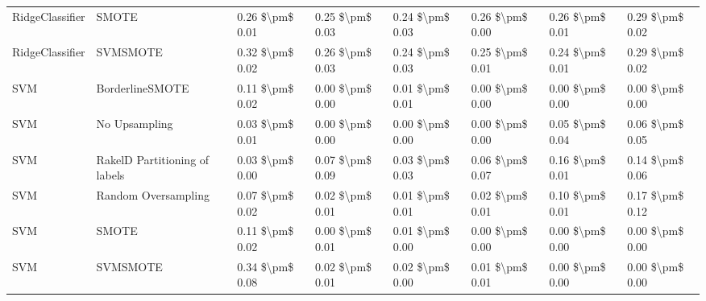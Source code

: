 \begin{tabular}{llllllll}
                RidgeClassifier &                         SMOTE &     0.26 \$\textbackslash pm\$ 0.01 &           0.25 \$\textbackslash pm\$ 0.03 &       0.24 \$\textbackslash pm\$ 0.03 &        0.26 \$\textbackslash pm\$ 0.00 &                         0.26 \$\textbackslash pm\$ 0.01 & 0.29 \$\textbackslash pm\$ 0.02 \\
                RidgeClassifier &                      SVMSMOTE &     0.32 \$\textbackslash pm\$ 0.02 &           0.26 \$\textbackslash pm\$ 0.03 &       0.24 \$\textbackslash pm\$ 0.03 &        0.25 \$\textbackslash pm\$ 0.01 &                         0.24 \$\textbackslash pm\$ 0.01 & 0.29 \$\textbackslash pm\$ 0.02 \\
                            SVM &               BorderlineSMOTE &     0.11 \$\textbackslash pm\$ 0.02 &           0.00 \$\textbackslash pm\$ 0.00 &       0.01 \$\textbackslash pm\$ 0.01 &        0.00 \$\textbackslash pm\$ 0.00 &                         0.00 \$\textbackslash pm\$ 0.00 & 0.00 \$\textbackslash pm\$ 0.00 \\
                            SVM &                 No Upsampling &     0.03 \$\textbackslash pm\$ 0.01 &           0.00 \$\textbackslash pm\$ 0.00 &       0.00 \$\textbackslash pm\$ 0.00 &        0.00 \$\textbackslash pm\$ 0.00 &                         0.05 \$\textbackslash pm\$ 0.04 & 0.06 \$\textbackslash pm\$ 0.05 \\
                            SVM & RakelD Partitioning of labels &     0.03 \$\textbackslash pm\$ 0.00 &           0.07 \$\textbackslash pm\$ 0.09 &       0.03 \$\textbackslash pm\$ 0.03 &        0.06 \$\textbackslash pm\$ 0.07 &                         0.16 \$\textbackslash pm\$ 0.01 & 0.14 \$\textbackslash pm\$ 0.06 \\
                            SVM &           Random Oversampling &     0.07 \$\textbackslash pm\$ 0.02 &           0.02 \$\textbackslash pm\$ 0.01 &       0.01 \$\textbackslash pm\$ 0.01 &        0.02 \$\textbackslash pm\$ 0.01 &                         0.10 \$\textbackslash pm\$ 0.01 & 0.17 \$\textbackslash pm\$ 0.12 \\
                            SVM &                         SMOTE &     0.11 \$\textbackslash pm\$ 0.02 &           0.00 \$\textbackslash pm\$ 0.01 &       0.01 \$\textbackslash pm\$ 0.00 &        0.00 \$\textbackslash pm\$ 0.00 &                         0.00 \$\textbackslash pm\$ 0.00 & 0.00 \$\textbackslash pm\$ 0.00 \\
                            SVM &                      SVMSMOTE &     0.34 \$\textbackslash pm\$ 0.08 &           0.02 \$\textbackslash pm\$ 0.01 &       0.02 \$\textbackslash pm\$ 0.00 &        0.01 \$\textbackslash pm\$ 0.01 &                         0.00 \$\textbackslash pm\$ 0.00 & 0.00 \$\textbackslash pm\$ 0.00 \\

\end{tabular}
